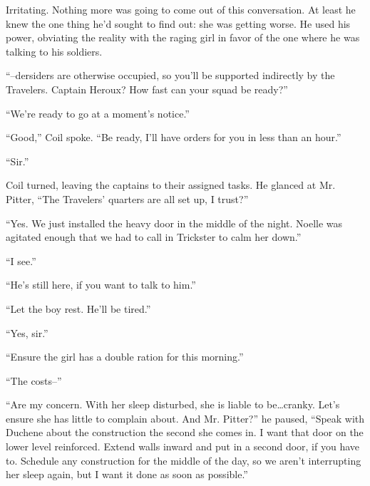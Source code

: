Irritating.  Nothing more was going to come out of this conversation.   At least he knew the one thing he'd sought to find out: she was getting worse.  He used his power, obviating the reality with the raging girl in favor of the one where he was talking to his soldiers.



``--dersiders are otherwise occupied, so you'll be supported indirectly by the Travelers.  Captain Heroux?  How fast can your squad be ready?''



``We're ready to go at a moment's notice.''



``Good,'' Coil spoke.  ``Be ready, I'll have orders for you in less than an hour.''



``Sir.''



Coil turned, leaving the captains to their assigned tasks.  He glanced at Mr. Pitter, ``The Travelers' quarters are all set up, I trust?''



``Yes.  We just installed the heavy door in the middle of the night.  Noelle was agitated enough that we had to call in Trickster to calm her down.''



``I see.''



``He's still here, if you want to talk to him.''



``Let the boy rest.  He'll be tired.''



``Yes, sir.''



``Ensure the girl has a double ration for this morning.''



``The costs--''



``Are my concern.  With her sleep disturbed, she is liable to be\ldots cranky.  Let's ensure she has little to complain about.  And Mr. Pitter?'' he paused, ``Speak with Duchene about the construction the second she comes in.  I want that door on the lower level reinforced.  Extend walls inward and put in a second door, if you have to.  Schedule any construction for the middle of the day, so we aren't interrupting her sleep again, but I want it done as soon as possible.''




